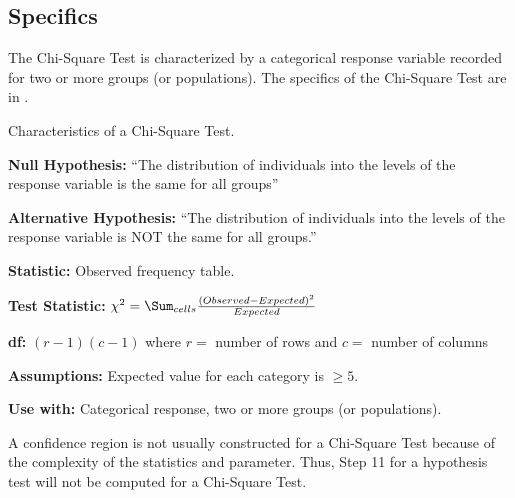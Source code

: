 \documentclass[10pt,openany]{book}\usepackage[]{graphicx}\usepackage[]{color}
\begin{document}
\subsection{Specifics}
\vspace{-3pt}
The Chi-Square Test is characterized by a categorical response variable recorded for two or more groups (or populations). The specifics of the Chi-Square Test are in .

\begin{table}[h]
\centering
\colorbox{ltgray}{
\begin{minipage}{.8\textwidth}
  \centering
	\caption{Characteristics of a Chi-Square Test.}\label{tab:Chispec}
\vspace{-3pt}
  \begin{Itemize}
      \item \textbf{Null Hypothesis:} ``The distribution of individuals into the levels of the response variable is the same for all groups''
      \item \textbf{Alternative Hypothesis:} ``The distribution of individuals into the levels of the response variable is NOT the same for all groups.''
      \item \textbf{Statistic:} Observed frequency table.
      \item \textbf{Test Statistic:} $\chi^{2} = \Sum_{cells}\frac{(Observed-Expected)^{2}}{Expected}$
      \item \textbf{df:} $(r-1)(c-1)$ where $r=$ number of rows and $c=$ number of columns
      \item \textbf{Assumptions:} Expected value for each category is $\geq5$.
      \item \textbf{Use with:} Categorical response, two or more groups (or populations).
  \end{Itemize}
\end{minipage}}
\end{table}

A confidence region is not usually constructed for a Chi-Square Test because of the complexity of the statistics and parameter. Thus, Step 11 for a hypothesis test will not be computed for a Chi-Square Test.

\vspace{-6pt}
\end{document}
